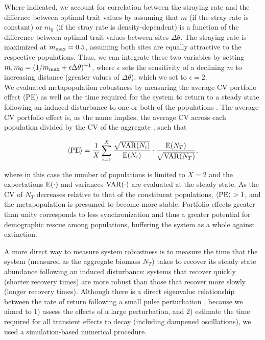 \documentclass{revtex4}
\begin{document}
Where indicated, we account for correlation between the straying rate and the differnce between optimal trait values by assuming that $m$ (if the stray rate is constant) or $m_0$ (if the stray rate is density-dependent) is a function of the difference between optimal trait values between sites $\Delta\theta$.
The straying rate is maximized at $m_{\rm max} = 0.5$, assuming both sites are equally attractive to the respective populations.
Thus, we can integrate these two variables by setting $m,m_0 = (1/m_{\rm max} + \epsilon \Delta\theta)^{-1}$, where $\epsilon$ sets the sensitivity of a declining $m$ to increasing distance (greater values of $\Delta\theta$), which we set to $\epsilon=2$.\\


\noindent We evaluated metapopulation robustness by measuring the average-CV portfolio effect (PE) \citep{Anderson:2014cx,Schindler:2015gf} as well as the time required for the system to return to a steady state following an induced disturbance to one or both of the populations \citep{Ovaskainen:2002il}.
The average-CV portfolio effect is, as the name implies, the average CV across each population divided by the CV of the aggregate \citep{Anderson:2013gb}, such that


\begin{equation}
\langle{\rm PE}\rangle =\frac{1}{X}\sum_{i=1}^{X} \frac{\sqrt{{\rm VAR}(N_i)}}{{\rm E}(N_i)}\cdot \frac{{\rm E}(N_T)}{\sqrt{{\rm VAR}(N_T)}},
\label{eq:pe}
\end{equation}

\noindent where in this case the number of populations is limited to $X=2$ and the expectations $\rm E(\cdot)$ and variances $\rm VAR(\cdot)$ are evaluated at the steady state.
As the CV of $N_T$ decreases relative to that of the constituent populations, $\langle{\rm PE}\rangle > 1$, and the metapopulation is presumed to become more stable.
Portfolio effects greater than unity corresponds to less synchronization  \citep{Loreau:2008ju,Anderson:2014cx,Yeakel:2013vz} and thus a greater potential for demographic rescue among populations, buffering the system as a whole against extinction. 

A more direct way to measure system robustness is to measure the time that the system (measured as the aggregate biomass $N_T$) takes to recover its steady state abundance following an induced disturbance: systems that recover quickly (shorter recovery times) are more robust than those that recover more slowly (longer recovery times).
Although there is a direct eigenvalue relationship between the rate of return following a small pulse perturbation \citep{GuckHolmes}, because we aimed to 1) assess the effects of a large perturbation, and 2) estimate the time required for all transient effects to decay (including dampened oscillations), we used a simulation-based numerical procedure.
\end{document}
